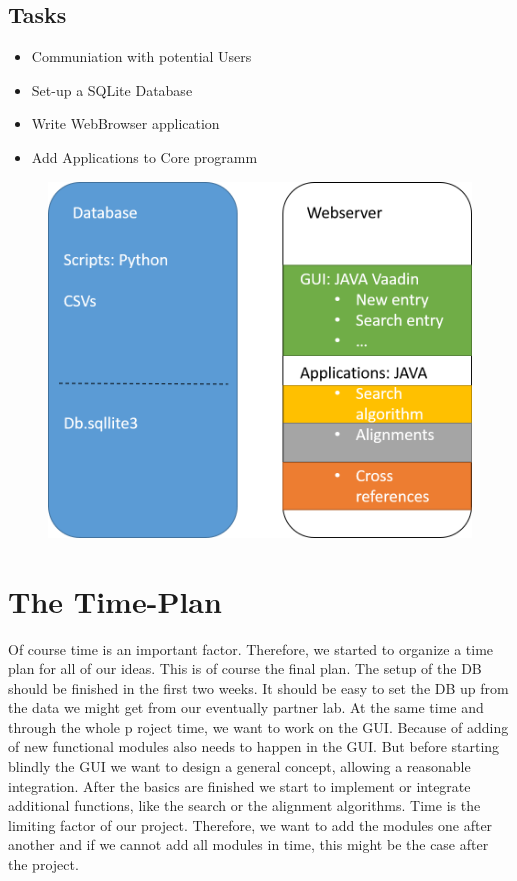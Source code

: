 \documentclass[]{article}
\begin{document}
	\subsection*{Tasks}
	\begin{itemize}
		\item Communiation with potential Users
		\item Set-up a SQLite Database
		\item Write WebBrowser application
		\item Add Applications to Core programm
	\end{itemize}
	
	\begin{figure}[h]
		\includegraphics[width=\textwidth]{../img/Structure.png}
	\end{figure}
	

	

\section{ The Time-Plan}
Of course time is an important factor. Therefore, we started to organize a time plan for all of our ideas. This is of course the final plan. The setup of the DB should be finished in the first two weeks. It should be easy to set the DB up from the data we might get from our eventually partner lab. At the same time and through the whole p	roject time, we want to work on the GUI. Because of adding of new functional modules also needs to happen in the GUI. But before starting blindly the GUI we want to design a general concept, allowing a reasonable integration. After the basics are finished we start to implement or integrate additional functions, like the search or the alignment algorithms. Time is the limiting factor of our project. Therefore, we want to add the modules one after another and if we cannot add all modules in time, this might be the case after the project.
  
\end{document}
